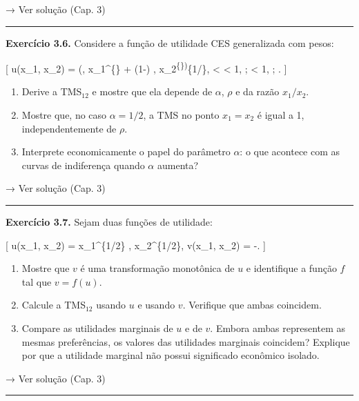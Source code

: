 \documentclass[11pt,twoside,openright]{book}
\begin{document}
→ Ver solução (Cap. 3)

\begin{center}\rule{0.5\linewidth}{0.5pt}\end{center}

\textbf{Exercício 3.6.} Considere a função de utilidade CES generalizada
com pesos:

{[} u(x\_1, x\_2) = \left(\alpha , x\_1\^{}\{\rho\} + (1-\alpha) ,
x\_2\textsuperscript{\{\rho\}\right)}\{1/\rho\},  \textless{}
\alpha \textless{} 1, ; \rho \textless{} 1, ; \rho {}. {]}

\begin{enumerate}
\def\labelenumi{(\alph{enumi})}
\item
  Derive a TMS\(_{12}\) e mostre que ela depende de \(\alpha\), \(\rho\)
  e da razão \(x_1/x_2\).
\item
  Mostre que, no caso \(\alpha = 1/2\), a TMS no ponto \(x_1 = x_2\) é
  igual a 1, independentemente de \(\rho\).
\item
  Interprete economicamente o papel do parâmetro \(\alpha\): o que
  acontece com as curvas de indiferença quando \(\alpha\) aumenta?
\end{enumerate}

→ Ver solução (Cap. 3)

\begin{center}\rule{0.5\linewidth}{0.5pt}\end{center}

\textbf{Exercício 3.7.} Sejam duas funções de utilidade:

{[} u(x\_1, x\_2) = x\_1\^{}\{1/2\} , x\_2\^{}\{1/2\}, \qquad v(x\_1,
x\_2) = -. {]}

\begin{enumerate}
\def\labelenumi{(\alph{enumi})}
\item
  Mostre que \(v\) é uma transformação monotônica de \(u\) e identifique
  a função \(f\) tal que \(v = f(u)\).
\item
  Calcule a TMS\(_{12}\) usando \(u\) e usando \(v\). Verifique que
  ambas coincidem.
\item
  Compare as utilidades marginais de \(u\) e de \(v\). Embora ambas
  representem as mesmas preferências, os valores das utilidades
  marginais coincidem? Explique por que a utilidade marginal não possui
  significado econômico isolado.
\end{enumerate}

→ Ver solução (Cap. 3)

\begin{center}\rule{0.5\linewidth}{0.5pt}\end{center}
\end{document}
